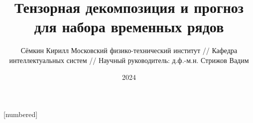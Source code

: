 
\usepackage[justification=centering, font=footnotesize]{caption}
[numbered]

\newcommand{\delayV}[1]{\overset{\leftarrow}{\textbf{x}}_{#1}}
\newcommand{\delayM}[1]{\overset{\leftarrow}{\mathbf{X}}_{#1}}

\theoremstyle{definition}
\newtheorem*{Def}{Определение}

\usepackage{grffile}

\setlength{\parskip}{0.1cm}

\date{2024}
\title{Тензорная декомпозиция и прогноз для набора временных рядов}
\author{Сёмкин Кирилл  Московский физико-технический институт // Кафедра интеллектуальных систем // Научный руководитель: д.ф.-м.н. Стрижов Вадим}


	
	\begin{frame}[c]
		\titlepage
	\end{frame}

